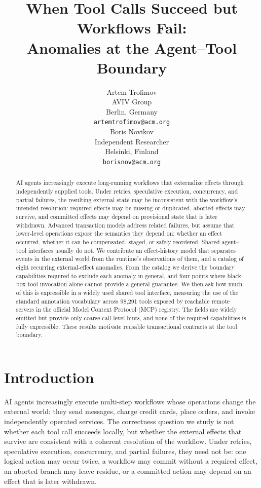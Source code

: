\documentclass{article}
\title{When Tool Calls Succeed but Workflows Fail:\\ Anomalies at the Agent--Tool Boundary}
\author{%
  Artem Trofimov \\
  AVIV Group \\
  Berlin, Germany \\
  \texttt{artemtrofimov@acm.org} \\
  \And
  Boris Novikov \\
  Independent Researcher \\
  Helsinki, Finland \\
  \texttt{borisnov@acm.org} \\
}
\begin{document}
\maketitle

\begin{abstract}
AI agents increasingly execute long-running workflows that externalize
effects through independently supplied tools. Under retries, speculative
execution, concurrency, and partial failures, the resulting external state
may be inconsistent with the workflow's intended resolution: required effects
may be missing or duplicated, aborted effects may survive, and committed
effects may depend on provisional state that is later withdrawn. Advanced
transaction models address related failures, but assume that
lower-level operations expose the semantics they depend on: whether an
effect occurred, whether it can be compensated, staged, or safely
reordered. Shared agent--tool interfaces usually do not. We contribute an effect-history model that separates events in the
external world from the runtime's observations of them, and a catalog of
eight recurring external-effect anomalies. From the catalog we derive the boundary
capabilities required to exclude each anomaly in general, and four points
where black-box tool invocation alone cannot provide a general guarantee. We then ask how much of this is expressible in a widely used shared tool
interface, measuring the use of the standard annotation vocabulary across
98{,}291 tools exposed by reachable remote servers in the official Model
Context Protocol (MCP) registry.
The fields are widely emitted but provide only coarse call-level hints, and
none of the required capabilities is fully expressible. These results motivate
reusable transactional contracts at the tool boundary.
\end{abstract}

\section{Introduction}

AI agents increasingly execute multi-step workflows whose operations
change the external world: they send messages, charge credit cards, place
orders, and invoke independently operated services. The correctness question
we study is not whether each tool call succeeds locally, but whether the
external effects that survive are consistent with a coherent resolution of
the workflow. Under retries, speculative execution,
concurrency, and partial failures, they need not be: one logical action may
occur twice, a workflow may commit without a required effect, an aborted
branch may leave residue, or a committed action may depend on an effect
that is later withdrawn.
\end{document}
